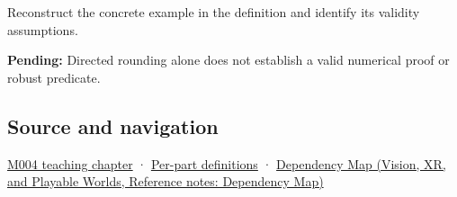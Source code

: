Reconstruct the concrete example in the definition and identify its validity assumptions.

\textbf{Pending:} Directed rounding alone does not establish a valid numerical proof or robust predicate.

\subsection{Source and navigation}\label{appendix-1823a14330cb-source-and-navigation}

\hyperref[01-foundations-i-ch001-a-stretching-ruler-for-real-valued-quantities]{M004 teaching chapter} · \hyperref[appendix-fd090d982a15-m004---parts-61-76]{Per-part definitions} · \href{../07-Vision-XR-and-Playable-Worlds/main.pdf\#nameddest=appendix-4ad47bdd269a}{Dependency Map (Vision, XR, and Playable Worlds, Reference notes: Dependency Map)}
